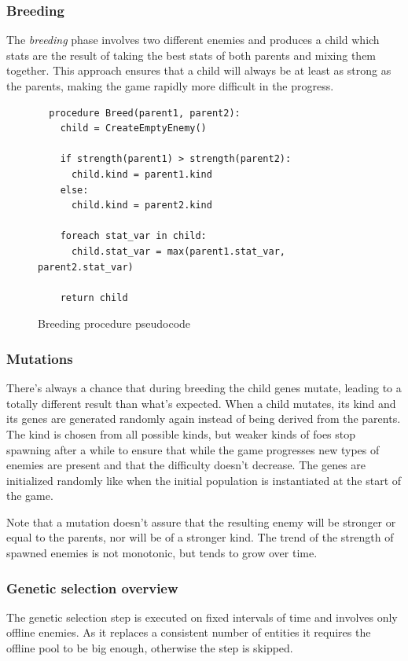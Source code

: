 \documentclass[11pt]{article}
\begin{document}
\pagebreak

\subsubsection{Breeding}
The \textit{breeding} phase involves two different enemies and produces a child which stats are the result of taking the best stats of both parents and mixing them together.
This approach ensures that a child will always be at least as strong as the parents, making the game rapidly more difficult in the progress.

\begin{figure}[H]
  \begin{lstlisting}
  procedure Breed(parent1, parent2):
    child = CreateEmptyEnemy()

    if strength(parent1) > strength(parent2):
      child.kind = parent1.kind
    else:
      child.kind = parent2.kind

    foreach stat_var in child:
      child.stat_var = max(parent1.stat_var, parent2.stat_var)

    return child 
  \end{lstlisting}
  \caption{Breeding procedure pseudocode}
\end{figure}

\subsubsection{Mutations}
There's always a chance that during breeding the child genes mutate, leading to a totally different result than what's expected.
When a child mutates, its kind and its genes are generated randomly again instead of being derived from the parents.
The kind is chosen from all possible kinds, but weaker kinds of foes stop spawning after a while to ensure that while the game progresses new types of enemies are present and that the difficulty doesn't decrease. 
The genes are initialized randomly like when the initial population is instantiated at the start of the game.

Note that a mutation doesn't assure that the resulting enemy will be stronger or equal to the parents, nor will be of a stronger kind. The trend of the strength of spawned enemies is not monotonic, but tends to grow over time.

\subsubsection{Genetic selection overview}
The genetic selection step is executed on fixed intervals of time and involves only offline enemies. As it replaces a consistent number of entities it requires the offline pool to be big enough, otherwise the step is skipped.
\end{document}
